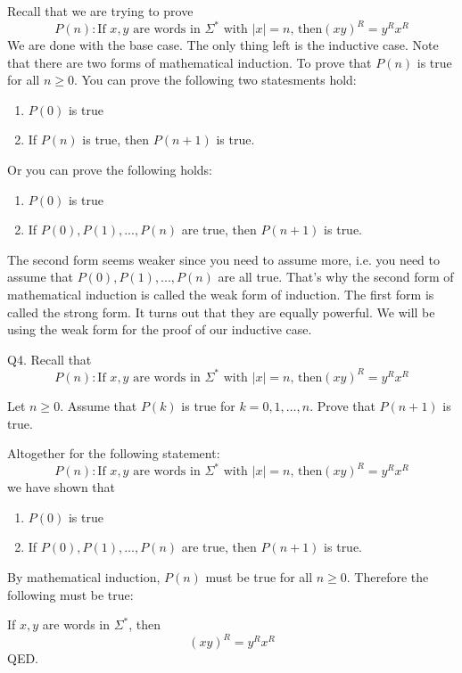 Recall that we are trying to prove
\[
P(n): 
\text{
If $x,y$ are words in $\Sigma^*$ with $|x| = n$, then
$(xy)^R = y^R x^R$
}
\]
We are done with the base case.
The only thing left is the inductive case.
Note that there are two forms of mathematical induction.
To prove that $P(n)$ is true for all $n \geq 0$.
You can prove the following two statesments hold:
\begin{enumerate}
\item $P(0)$ is true
\item If $P(n)$ is true, then $P(n+1)$ is true.
\end{enumerate}
Or you can prove the following holds:
\begin{enumerate}
\item $P(0)$ is true
\item If $P(0), P(1), ..., P(n)$ are true, then $P(n+1)$ is true.
\end{enumerate}
The second form seems weaker since you need to assume more, 
i.e. you need to assume that $P(0), P(1), ..., P(n)$ are all true.
That's why the second form of mathematical induction is called
the weak form of induction.
The first form is called the strong form.
It turns out that they are equally powerful.
We will be using the weak form for the proof
of our inductive case.
\newpage

Q4. 
Recall that 
\[
P(n): 
\text{
If $x,y$ are words in $\Sigma^*$ with $|x| = n$, then
$(xy)^R = y^R x^R$
}
\]

Let $n \geq 0$.
Assume that $P(k)$ is true for $k = 0, 1, \ldots, n$.
Prove that $P(n+1)$ is true.

\SOLUTION

\newpage

Altogether for the following statement:
\[
P(n): 
\text{
If $x,y$ are words in $\Sigma^*$ with $|x| = n$, then
$(xy)^R = y^R x^R$
}
\]
we have shown that
\begin{enumerate}
\item $P(0)$ is true
\item If $P(0), P(1), \ldots, P(n)$ are true, then $P(n+1)$ is true.
\end{enumerate}
By mathematical induction, $P(n)$ must be true for all $n \geq 0$.
Therefore the following must be true:

If $x,y$ are words in $\Sigma^*$, then
\[
(xy)^R = y^R x^R
\]
QED.


